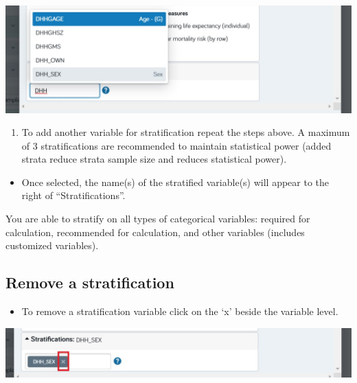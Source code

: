 \documentclass[]{book}
\providecommand{\tightlist}{%
  \setlength{\itemsep}{0pt}\setlength{\parskip}{0pt}}
\begin{document}
\begin{center}\includegraphics{Images/StratSelect} \end{center}

\begin{enumerate}
\def\labelenumi{\arabic{enumi}.}
\setcounter{enumi}{2}
\tightlist
\item
  To add another variable for stratification repeat the steps above. A
  maximum of 3 stratifications are recommended to maintain statistical
  power (added strata reduce strata sample size and reduces statistical
  power).
\end{enumerate}

\begin{itemize}
\tightlist
\item
  Once selected, the name(s) of the stratified variable(s) will appear
  to the right of ``Stratifications''.
\end{itemize}

You are able to stratify on all types of categorical variables: required
for calculation, recommended for calculation, and other variables
(includes customized variables).

\subsection{Remove a stratification}\label{remove-a-stratification}

\begin{itemize}
\tightlist
\item
  To remove a stratification variable click on the `x' beside the
  variable level.
\end{itemize}

\begin{center}\includegraphics{Images/StratRemove} \end{center}
\end{document}
